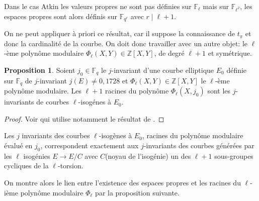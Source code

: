 \documentclass[10pt,a4paper]{book}
\theoremstyle{plain}
\theoremstyle{definition}
\theoremstyle{definition}
\theoremstyle{definition}
\newtheorem{prop}[thm]{Proposition}
\theoremstyle{definition}
\theoremstyle{remark}
\theoremstyle{remark}
\theoremstyle{definition}
\begin{document}
	Dans le cas Atkin les valeurs propres ne sont pas définies sur $\mathbb{F}_\ell$ mais sur $\mathbb{F}_{\ell^2}$, les espaces propres sont alors définis sur $\mathbb{F}_{q^r}$ avec $r \mid \ell+1$.
	
	
	On ne peut appliquer à priori ce résultat, car il suppose la connaissance de $t_{\pi}$ et donc la cardinalité de la courbe. On doit donc travailler avec un autre objet: le $\ell$-ème polynôme modulaire $\Phi_{\ell}(X,Y) \in \mathbb{Z}[X,Y] $, de degré $\ell+1$ et symétrique. 
 
\begin{prop}
Soient $j_0 \in \mathbb{F}_q$ le $j$-invariant d'une courbe elliptique $E_0$ définie sur $\mathbb{F}_q$ de $j$-invariant $j(E) \neq 0,1728$ et  $\Phi_{\ell}(X,Y) \in \mathbb{Z}[X,Y] $ le $\ell$-ème polynôme modulaire. Les $\ell+1$ racines du polynôme $\Phi_{\ell}(X,j_0)$ sont les $j$-invariants de courbes $\ell$-isogénes à $E_0$. 
\end{prop}

\begin{proof}
Voir \cite[Théorème 4.1.1]{Fouquet01} qui utilise notamment le résultat de \cite[Theorem 11.23]{Cox89}.
\end{proof}
 
Les $j$ invariants des courbes $\ell$-isogènes à $E_0$, racines du polynôme modulaire évalué en $j_0$, correspondent exactement aux $j$-invariants des  courbes générées par les $\ell$ isogénies $E \to E/C$ avec $C$(noyau de l'isogénie) un des $\ell+1$ sous-groupes cycliques de la $\ell$-torsion. 

On montre alors le lien entre l'existence des espaces propres et les racines du $\ell$-ième polynôme modulaire $\Phi_{\ell}$ par la proposition suivante. 

 
 
 
\end{document}
